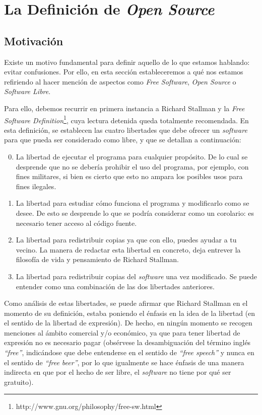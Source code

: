 \section{La Definición de \textit{Open Source}}

\subsection{Motivación}
\label{SUBSEC:DefinicionMotivacion}

Existe un motivo fundamental para definir aquello de lo que estamos hablando:
evitar confusiones. Por ello, en esta sección estableceremos a qué nos estamos
refiriendo al hacer mención de aspectos como \textit{Free Software},
\textit{Open Source} o \textit{Software Libre}.

Para ello, debemos recurrir en primera instancia a Richard Stallman y la
\textit{Free
Software Definition}\footnote{http://www.gnu.org/philosophy/free-sw.html}, cuya
lectura detenida queda totalmente recomendada. En esta definición, se establecen
las cuatro libertades que debe ofrecer un \textit{software} para que pueda ser
considerado como libre, y que se detallan a continuación:

\begin{enumerate}
  \setcounter{enumi}{-1}
  \item La libertad de ejecutar el programa para cualquier propósito. De lo
cual se desprende que no se debería prohibir el uso del programa, por ejemplo,
con fines militares, si bien es cierto que esto no ampara los posibles usos para
fines ilegales.
  \item La libertad para estudiar cómo funciona el programa y modificarlo como
se desee. De esto se desprende lo que se podría considerar como un corolario:
es necesario tener acceso al código fuente.
  \item La libertad para redistribuir copias ya que con ello, puedes ayudar a
tu vecino. La manera de redactar esta libertad en concreto, deja entrever la
filosofía de vida y pensamiento de Richard Stallman.
  \item La libertad para redistribuir copias del \textit{software} una vez
modificado. Se puede entender como una combinación de las dos libertades
anteriores.
\end{enumerate}

Como análisis de estas libertades, se puede afirmar que Richard Stallman en el
momento de su definición, estaba poniendo el énfasis en la idea de la libertad
(en el sentido de la libertad de expresión). De hecho, en ningún momento se
recogen menciones al ámbito comercial y/o económico, ya que para tener libertad
de expresión no es necesario pagar (obsérvese la desambiguación del término
inglés \textit{``free''}, indicándose que debe entenderse en el sentido de
\textit{``free speech''} y nunca en el sentido de \textit{``free beer''}, por lo
que igualmente se hace énfasis de una manera indirecta en que por el hecho de
ser libre, el \textit{software} no tiene por qué ser gratuito).

